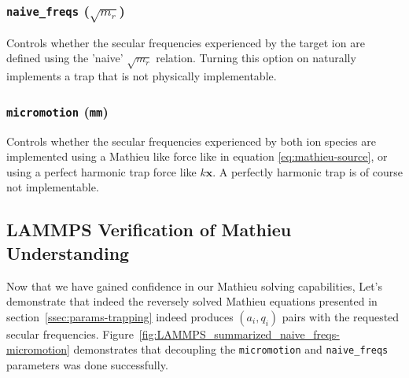 \subsubsection*{\texttt{naive\_freqs} ($\sqrt{m_r}$)}

Controls whether the secular frequencies experienced by the target  ion are defined using the 'naive' $\sqrt{m_r}$ relation. Turning this option on naturally implements a trap that is not physically implementable.

\subsubsection*{\texttt{micromotion} (\texttt{mm})}

Controls whether the secular frequencies experienced by both ion species are implemented using a Mathieu like force like in equation \ref{eq:mathieu-source}, or using a perfect harmonic trap force like $k \mathbf{x}$. A perfectly harmonic trap is of course not implementable.

\subsection{LAMMPS Verification of Mathieu Understanding}

Now that we have gained confidence in our Mathieu solving capabilities, Let's demonstrate that indeed the reversely solved Mathieu equations presented in section~\ref{ssec:params-trapping} indeed produces $(a_i, q_i)$ pairs with the requested secular frequencies. Figure~\ref{fig:LAMMPS_summarized_naive_freqs-micromotion} demonstrates that decoupling the \texttt{micromotion} and \texttt{naive\_freqs} parameters was done successfully.

